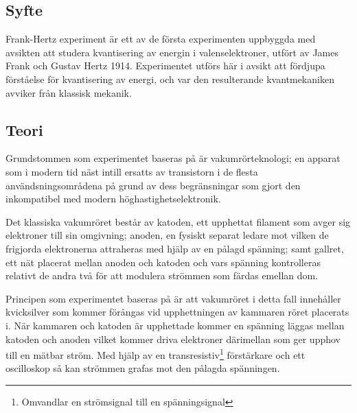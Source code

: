 \subsection*{Syfte}

Frank-Hertz experiment är ett av de första experimenten uppbyggda med avsikten att studera kvantisering av energin i valenselektroner, utfört av James Frank och Gustav Hertz 1914.  Experimentet utförs här i avsikt att fördjupa förståelse för kvantisering av energi, och var den resulterande kvantmekaniken avviker från klassisk mekanik.

\subsection*{Teori}

Grundstommen som experimentet baseras på är vakumrörteknologi; en apparat som i modern tid näst intill ersatts av transistorn i de flesta användsningsområdena på grund av dess begränsningar som gjort den inkompatibel med modern höghastighetselektronik.

Det klassiska vakumröret består av katoden, ett upphettat filament som avger sig elektroner till sin omgivning; anoden, en fysiskt separat ledare mot vilken de frigjorda elektronerna attraheras med hjälp av en pålagd spänning; samt gallret, ett nät placerat mellan anoden och katoden och vars spänning kontrolleras relativt de andra två för att modulera strömmen som färdas emellan dom.

Principen som experimentet baseras på är att vakumröret i detta fall innehåller kvicksilver som kommer förångas vid upphettningen av kammaren röret placerats i. När kammaren och katoden är upphettade kommer en spänning läggas mellan katoden och anoden vilket kommer driva elektroner därimellan som ger upphov till en mätbar ström. Med hjälp av en transresistiv\footnote{Omvandlar en strömsignal till en spänningsignal} förstärkare och ett oscilloskop så kan strömmen grafas mot den pålagda spänningen. 

